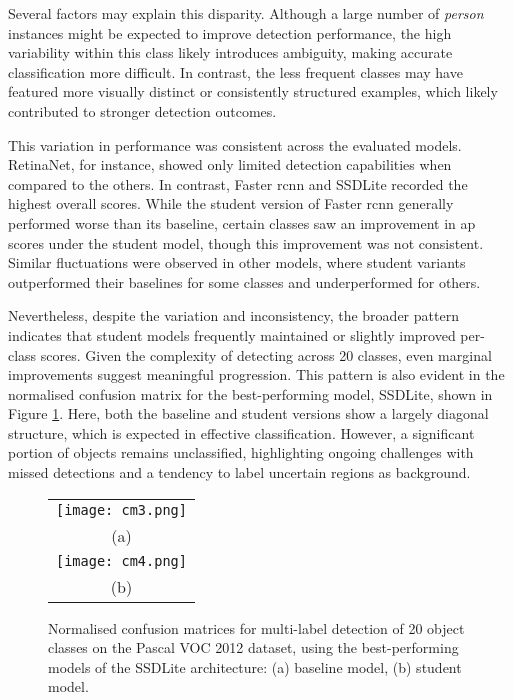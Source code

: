 Several factors may explain this disparity. Although a large number of \textit{person} instances might be expected to improve detection performance, the high variability within this class likely introduces ambiguity, making accurate classification more difficult. In contrast, the less frequent classes may have featured more visually distinct or consistently structured examples, which likely contributed to stronger detection outcomes.

This variation in performance was consistent across the evaluated models. RetinaNet, for instance, showed only limited detection capabilities when compared to the others. In contrast, Faster \gls{rcnn} and SSDLite recorded the highest overall scores. While the student version of Faster \gls{rcnn} generally performed worse than its baseline, certain classes saw an improvement in \gls{ap} scores under the student model, though this improvement was not consistent. Similar fluctuations were observed in other models, where student variants outperformed their baselines for some classes and underperformed for others.

Nevertheless, despite the variation and inconsistency, the broader pattern indicates that student models frequently maintained or slightly improved per-class scores. Given the complexity of detecting across 20 classes, even marginal improvements suggest meaningful progression.
This pattern is also evident in the normalised confusion matrix for the best-performing model, SSDLite, shown in Figure \ref{fig:cm_pascal_voc}. Here, both the baseline and student versions show a largely diagonal structure, which is expected in effective classification. However, a significant portion of objects remains unclassified, highlighting ongoing challenges with missed detections and a tendency to label uncertain regions as background.

\begin{figure}[p]%
  \centering
  \begin{tabular}{c}
    \texttt{[image: cm3.png]} \\
    \small (a) \\
    \addlinespace[1em]
    \texttt{[image: cm4.png]} \\
     \small (b) \\
  \end{tabular}
  \caption{Normalised confusion matrices for multi-label detection of 20 object classes on the Pascal VOC 2012 dataset, using the best-performing models of the SSDLite architecture: (a) baseline model, (b) student model.}
  \label{fig:cm_pascal_voc}
\end{figure}


